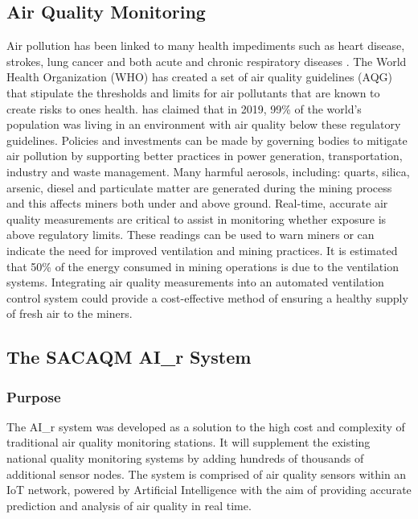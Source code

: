 \documentclass[a4paper,twoside,12pt]{report}
\begin{document}
\subsection{Air Quality Monitoring}
 Air pollution has been linked to many health impediments such as heart disease, strokes, lung cancer and both acute and chronic respiratory diseases \citep{WHO_2022}. The World Health Organization (WHO) has created a set of air quality guidelines (AQG) that stipulate the thresholds and limits for air pollutants that are known to create risks to ones health. \cite{WHO_2022} has claimed that in 2019, 99\% of the world's population was living in an environment with air quality below these regulatory guidelines. Policies and investments can be made by governing bodies to mitigate air pollution by supporting better practices in power generation, transportation, industry and waste management.
 \newline \newline
Many harmful aerosols, including: quarts, silica, arsenic, diesel and particulate matter are generated during the mining process and this affects miners both under and above ground\citep{Hercus_2022}. Real-time, accurate air quality measurements are critical to assist in monitoring whether exposure is above regulatory limits. These readings can be used to warn miners or can indicate the need for improved ventilation and mining practices. It is estimated that 50\% of the energy consumed in mining operations is due to the ventilation systems\citep{Hercus_2022}. Integrating air quality measurements into an automated ventilation control system could provide a cost-effective method of ensuring a healthy supply of fresh air to the miners. 

\subsection{The SACAQM AI\_r System}
\subsubsection{Purpose}
The AI\_r system was developed as a solution to the high cost and complexity of traditional air quality monitoring stations\citep{SACAQM}. It will supplement the existing national quality monitoring systems by adding hundreds of thousands of additional sensor nodes. The system is comprised of air quality sensors within an IoT network, powered by Artificial Intelligence with the aim of providing accurate prediction and analysis of air quality in real time\citep{SACAQM}.
\end{document}
